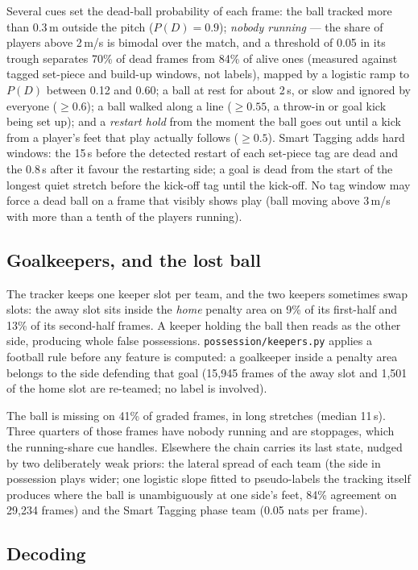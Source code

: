 \documentclass[11pt,a4paper]{article}
\newcommand{\code}[1]{\texttt{#1}}
\begin{document}
Several cues set the dead-ball probability of each frame: the ball tracked more than 0.3\,m outside
the pitch ($P(D)=0.9$); \emph{nobody running} --- the share of players above 2\,m/s is bimodal over
the match, and a threshold of 0.05 in its trough separates 70\% of dead frames from 84\% of alive
ones (measured against tagged set-piece and build-up windows, not labels), mapped by a logistic
ramp to $P(D)$ between 0.12 and 0.60; a ball at rest for about 2\,s, or slow and ignored by everyone
($\geq0.6$); a ball walked along a line ($\geq0.55$, a throw-in or goal kick being set up); and a
\emph{restart hold} from the moment the ball goes out until a kick from a player's feet that play
actually follows ($\geq0.5$). Smart Tagging adds hard windows: the 15\,s before the detected restart
of each set-piece tag are dead and the 0.8\,s after it favour the restarting side; a goal is dead
from the start of the longest quiet stretch before the kick-off tag until the kick-off. No tag
window may force a dead ball on a frame that visibly shows play (ball moving above 3\,m/s with
more than a tenth of the players running).

\subsection{Goalkeepers, and the lost ball}

The tracker keeps one keeper slot per team, and the two keepers sometimes swap slots: the away
slot sits inside the \emph{home} penalty area on 9\% of its first-half and 13\% of its second-half
frames. A keeper holding the ball then reads as the other side, producing whole false
possessions. \code{possession/keepers.py} applies a football rule before any feature is
computed: a goalkeeper inside a penalty area belongs to the side defending that goal (15,945 frames
of the away slot and 1,501 of the home slot are re-teamed; no label is involved).

The ball is missing on 41\% of graded frames, in long stretches (median 11\,s). Three quarters of
those frames have nobody running and are stoppages, which the running-share cue handles. Elsewhere
the chain carries its last state, nudged by two deliberately weak priors: the lateral spread of
each team (the side in possession plays wider; one logistic slope fitted to pseudo-labels the
tracking itself produces where the ball is unambiguously at one side's feet, 84\% agreement on
29,234 frames) and the Smart Tagging phase team (0.05 nats per frame).

\subsection{Decoding}
\end{document}
